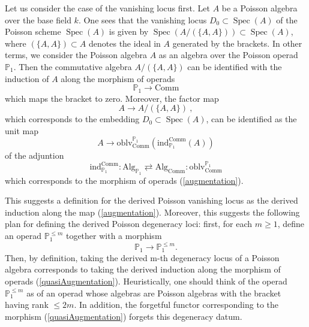 \documentclass[10pt, oneside]{amsart}
\theoremstyle{plain}
\newcommand{\alg}{\mathrm{Alg}}
\newcommand{\comm}{\mathrm{Comm}}
\newcommand{\PP}{\mathbb{P}}
\DeclareMathOperator{\spec}{Spec}
\begin{document}
Let us consider the case of the vanishing locus first.
Let $A$ be a Poisson algebra over the base field $k$.
One sees that the vanishing locus $D_0 \subset \spec(A)$ of the Poisson scheme $\spec(A)$ is 
given by $\spec(A/(\{A, A\})) \subset \spec(A)$, where $(\{A,A\}) \subset A$ denotes the ideal in $A$ generated by the brackets.
In other terms, we consider the Poisson algebra $A$ as an algebra over the Poisson operad
$\PP_1$. Then the commutative algebra $A/(\{A, A\})$ can be identified with the induction of $A$ along the morphism of operads
\begin{equation}\label{augmentation}
\PP_1 \longrightarrow \comm
\end{equation}
which maps the bracket to zero. Moreover, the factor map
\begin{equation*}
A \longrightarrow A/(\{A, A\}) \:,
\end{equation*}
which corresponds to the embedding $D_0 \subset \spec(A)$, can be identified as the unit map
\begin{equation*}
A \longrightarrow \text{oblv}_\comm^{\PP_1}(\text{ind}^\comm_{\PP_1}(A))
\end{equation*}
of the adjuntion
\begin{equation*}
\text{ind}_{\PP_1}^\comm \colon \alg_{\PP_1} \rightleftarrows \alg_\comm : \text{oblv}^{\PP_1}_\comm
\end{equation*}
which corresponds to the morphism of operads (\ref{augmentation}).

This suggests a definition for the derived Poisson vanishing locus as the derived induction along the map (\ref{augmentation}).
Moreover, this suggests the following plan for defining the derived Poisson degeneracy loci: first, for each $m \ge 1$,
define an operad $\PP_1^{\le m}$ together with a morphism
\begin{equation}\label{quasiAugmentation}
\PP_1 \longrightarrow \PP_1^{\le m}.
\end{equation}
Then, by definition, taking the derived m-th degeneracy locus of a Poisson algebra corresponds to taking the derived induction along
the morphism of operads (\ref{quasiAugmentation}). Heuristically, one should think of the operad $\PP_1^{\le m}$ as of an operad whose
algebras are Poisson algebras with the bracket having rank $\le 2m$. In addition, the forgetful functor corresponding to the morphism
(\ref{quasiAugmentation}) forgets this degeneracy datum.
\end{document}
